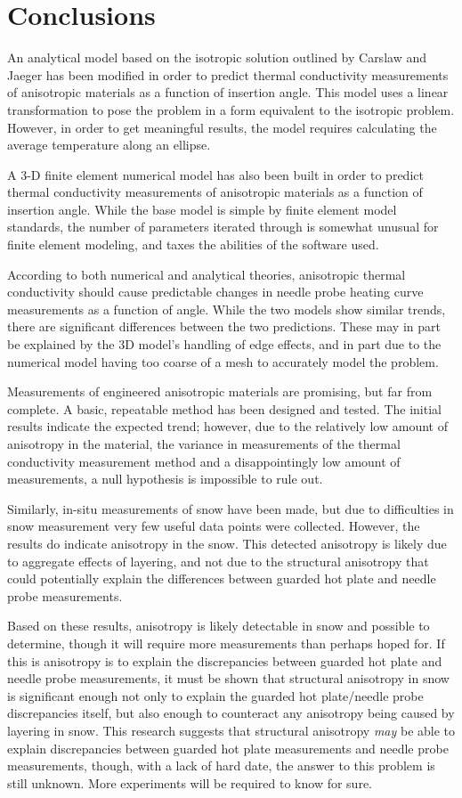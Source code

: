 \chapter{Conclusions}

An analytical model based on the isotropic solution outlined by
Carslaw and Jaeger has been modified in order to predict thermal conductivity
measurements of anisotropic materials as a function of insertion angle.  This
model uses a linear transformation to pose the problem in a form equivalent to
the isotropic problem. However, in order to get meaningful results, the model
requires calculating the average temperature along an ellipse.

A 3-D finite element numerical model has also been built in order to predict
thermal conductivity measurements  of anisotropic materials as a function of
insertion angle. While the base model is simple by finite element model
standards, the number of parameters iterated through is somewhat unusual for
finite element modeling, and taxes the abilities of the software used.

According to both numerical and analytical theories, anisotropic thermal
conductivity should cause predictable changes in needle probe heating curve
measurements as a function of angle. While the two models show similar trends, 
there are significant differences between the two predictions. These
may in part be explained by the 3D model's handling of edge effects, and in part
due to the numerical model having too coarse of a mesh to accurately model the
problem.

Measurements of engineered anisotropic materials are promising, but far from
complete. A basic, repeatable method has been designed and tested. The initial
results indicate the expected trend; however, due to the relatively low
amount of anisotropy in the material, the variance in measurements of the thermal
conductivity measurement method and a disappointingly low amount of
measurements, a null hypothesis is impossible to rule out.

Similarly, in-situ measurements of snow have been made, but due to difficulties
in snow measurement very few useful data points were collected. However, the
results do indicate anisotropy in the snow. This detected anisotropy is likely
due to aggregate effects of layering, and not due to the structural anisotropy
that could potentially explain the differences between guarded hot plate and
needle probe measurements.

Based on these results, anisotropy is likely detectable in snow and possible to
determine, though it will require more measurements than perhaps hoped for. If
this is anisotropy is to explain the discrepancies between guarded hot plate and
needle probe measurements, it must be shown that structural anisotropy
in snow is significant enough not only to explain the guarded hot plate/needle
probe discrepancies itself, but also enough to counteract any anisotropy being
caused by layering in snow. This research suggests that structural anisotropy
\emph{may} be able to explain discrepancies between guarded hot plate
measurements and needle probe measurements, though, with a lack of hard date,
the answer to this problem is still unknown. More experiments will be
required to know for sure.

